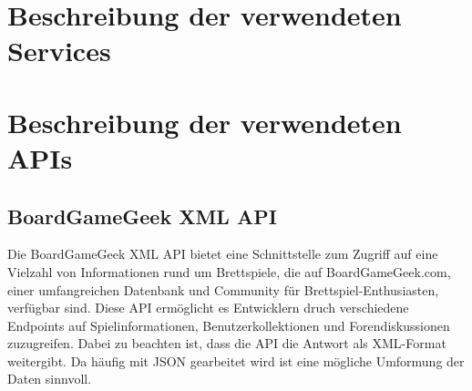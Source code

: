 \section{Beschreibung der verwendeten Services}

\section{Beschreibung der verwendeten APIs}
\subsection{BoardGameGeek XML API }
Die BoardGameGeek XML API bietet eine Schnittstelle zum Zugriff auf eine Vielzahl von Informationen rund um Brettspiele,
die auf BoardGameGeek.com, einer umfangreichen Datenbank und Community für Brettspiel-Enthusiasten,
verfügbar sind. Diese API ermöglicht es Entwicklern druch verschiedene Endpoints auf Spielinformationen,
Benutzerkollektionen und Forendiskussionen zuzugreifen. Dabei zu beachten ist, dass die API die Antwort als XML-Format weitergibt. 
Da häufig mit JSON gearbeitet wird ist eine mögliche Umformung der Daten sinnvoll.
